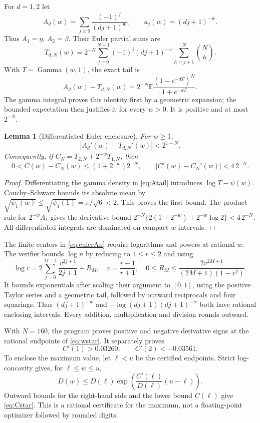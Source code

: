 \documentclass[11pt,a4paper]{article}
\numberwithin{equation}{section}
\newtheorem{lemma}[theorem]{Lemma}
\theoremstyle{definition}
\theoremstyle{remark}
\begin{document}
For $d=1,2$ let
\[
 A_d(w)=\sum_{j\ge0}\frac{(-1)^j}{(dj+1)^w},\qquad
 a_j(w)=(dj+1)^{-w}.
\]
Thus $A_1=\eta$, $A_2=\beta$. Their Euler partial sums are
\begin{equation}\label{eq:eulerAn}
 T_{d,N}(w)=2^{-N}\sum_{j=0}^{N-1}(-1)^j(dj+1)^{-w}
                \sum_{h=j+1}^N\binom Nh.
\end{equation}
With $T\sim\operatorname{Gamma}(w,1)$, the exact tail is
\begin{equation}\label{eq:Atail}
 A_d(w)-T_{d,N}(w)
 =2^{-N}\mathbb E\frac{(1-e^{-dT})^N}{1+e^{-dT}}.
\end{equation}
The gamma integral proves this identity first by a geometric expansion;
the bounded expectation then justifies it for every $w>0$.
It is positive and at most $2^{-N}$.

\begin{lemma}[Differentiated Euler enclosure]\label{lem:eulerderivative}
For $w\ge1$,
\[
 |A_d'(w)-T_{d,N}'(w)|<2^{1-N}.
\]
Consequently, if $C_N=T_{2,N}+2^{-w}T_{1,N}$, then
\begin{equation}\label{eq:Ccertbounds}
 0<C(w)-C_N(w)\le(1+2^{-w})2^{-N},\qquad
 |C'(w)-C_N'(w)|<4\,2^{-N}.
\end{equation}
\end{lemma}
\begin{proof}
Differentiating the gamma density in \eqref{eq:Atail} introduces
$\log T-\psi(w)$. Cauchy--Schwarz bounds its absolute mean by
$\sqrt{\psi_1(w)}\le\sqrt{\psi_1(1)}=\pi/\sqrt6<2$.
This proves the first bound. The product rule for $2^{-w}A_1$ gives
the derivative bound
$2^{-N}\{2(1+2^{-w})+2^{-w}\log2\}<4\,2^{-N}$.
All differentiated integrals are dominated on compact $w$-intervals.
\end{proof}

The finite centers in \eqref{eq:eulerAn} require logarithms and powers
at rational $w$. The verifier bounds $\log n$ by reducing to $1\le r\le2$
and using
\[
 \log r=2\sum_{j=0}^{M-1}\frac{v^{2j+1}}{2j+1}+R_M,
 \quad v=\frac{r-1}{r+1},\quad
 0\le R_M\le\frac{2v^{2M+1}}{(2M+1)(1-v^2)}.
\]
It bounds exponentials after scaling their argument to $[0,1]$, using
the positive Taylor series and a geometric tail, followed by outward
reciprocals and four squarings. Thus $(dj+1)^{-w}$ and
$-\log(dj+1)(dj+1)^{-w}$ both have rational enclosing intervals.
Every addition, multiplication and division rounds outward.

With $N=160$, the program proves positive and negative derivative
signs at the rational endpoints of \eqref{eq:wstar}. It separately proves
\[
 C'(1)>0.03260,\qquad C'(2)<-0.03561.
\]
To enclose the maximum value, let $\ell<u$ be the certified endpoints.
Strict log-concavity gives, for $\ell\le w\le u$,
\[
 D(w)\le D(\ell)
 \exp\!\left(\frac{C'(\ell)}{D(\ell)}(u-\ell)\right).
\]
Outward bounds for the right-hand side and the lower bound $C(\ell)$
give \eqref{eq:Cstar}. This is a rational certificate for the maximum,
not a floating-point optimizer followed by rounded digits.
\end{document}
